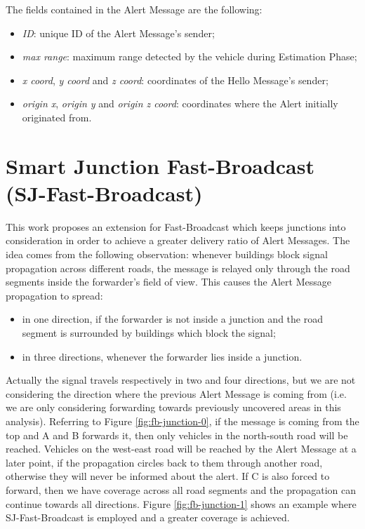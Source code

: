 		The fields contained in the Alert Message are the following:
		\begin{itemize}
			\item \textit{ID}: unique ID of the Alert Message's sender;
			\item \textit{max range}: maximum range detected by the vehicle during Estimation Phase;
			\item \textit{x coord}, \textit{y coord} and \textit{z coord}: coordinates of the Hello Message's sender;
			\item \textit{origin x}, \textit{origin y} and \textit{origin z coord}: coordinates where the Alert initially originated from.
		\end{itemize}
	
	\section{Smart Junction Fast-Broadcast (SJ-Fast-Broadcast)}
		\label{sj:fb}
		This work proposes an extension for Fast-Broadcast which keeps junctions into consideration in order to achieve a greater delivery ratio of Alert Messages. The idea comes from the following observation: whenever buildings block signal propagation across different roads, the message is relayed only through the road segments inside the forwarder's field of view. This causes the Alert Message propagation to spread:
		\begin{itemize}
			\item in one direction, if the forwarder is not inside a junction and the road segment is surrounded by buildings which block the signal;
			\item in three directions, whenever the forwarder lies inside a junction. 
		\end{itemize}
		Actually the signal travels respectively in two and four directions, but we are not considering the direction where the previous Alert Message is coming from (i.e. we are only considering forwarding towards previously uncovered areas in this analysis).
		Referring to Figure \ref{fig:fb-junction-0}, if the message is coming from the top and A and B forwards it, then only vehicles in the north-south road will be reached. Vehicles on the west-east road will be reached by the Alert Message at a later point, if the propagation circles back to them through another road, otherwise they will never be informed about the alert. If C is also forced to forward, then we have coverage across all road segments and the propagation can continue towards all directions. Figure \ref{fig:fb-junction-1} shows an example where SJ-Fast-Broadcast is employed and a greater coverage is achieved.
		
